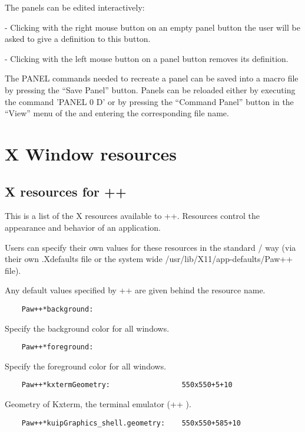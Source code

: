    The panels can be edited interactively:

   - Clicking with the right mouse button on an empty panel button the user
   will be asked to give a definition to this button.

   - Clicking with the left mouse button on a panel button removes its
   definition.

   The PANEL commands needed to recreate a panel can be saved into a macro
file by pressing the ``Save Panel'' button.  Panels can be reloaded either by
executing the command 'PANEL 0 D' or by pressing the ``Command Panel'' button
   in the ``View'' menu of the \EW{} and entering the corresponding
   file name.



\appendix
\chapter{X Window resources}
\section{X resources for \PAW++}

   This is a list of the X resources available to \PAW++.  Resources control
   the appearance and behavior of an application.

   Users can specify their own values for these resources in the standard
   /\MOTIF{} way (via their own .Xdefaults file or the system wide
   /usr/lib/X11/app-defaults/Paw++ file).

   Any default values specified by \PAW++{} are given behind the resource name.

\begin{verbatim}
    Paw++*background:
\end{verbatim}

   Specify the background color for all windows.

\begin{verbatim}
    Paw++*foreground:
\end{verbatim}

   Specify the foreground color for all windows.

\begin{verbatim}
    Paw++*kxtermGeometry:                 550x550+5+10
\end{verbatim}

Geometry of Kxterm, the \KUIP{} terminal emulator (\PAW++{} \EW).

\begin{verbatim}
    Paw++*kuipGraphics_shell.geometry:    550x550+585+10
\end{verbatim}

